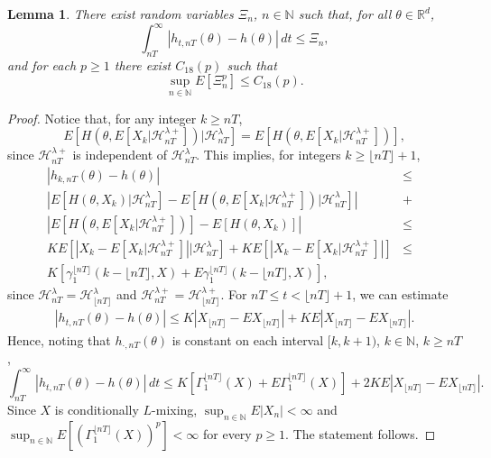 \documentclass[a4paper,draft]{article}
\newtheorem{lemma}[theorem]{Lemma}
\begin{document}
\begin{lemma}\label{kkk}
There exist random variables $\Xi_n$, $n\in\mathbb{N}$ such that, for all $\theta\in\mathbb{R}^d$,
$$
\int_{nT}^{\infty}|h_{t,nT}(\theta)-h(\theta)|\, dt\leq \Xi_n,
$$
and for each $p\geq 1$ there exist $C_{18}(p)$ such that
$$
\sup_{n\in\mathbb{N}} E[\Xi_n^p]\leq C_{18}(p).
$$
\end{lemma}
\begin{proof}
Notice that, for any integer $k\geq nT$,
$$
E[H(\theta,E[X_k\vert\mathcal{H}_{nT}^{\lambda +}])\vert\mathcal{H}_{nT}^{\lambda}]=
E[H(\theta, E[X_k\vert\mathcal{H}_{nT}^{\lambda +}])],
$$
since $\mathcal{H}_{nT}^{\lambda +}$ is independent
of $\mathcal{H}_{nT}^{\lambda}$.
This implies, for integers $k\geq \lfloor nT\rfloor+1$,
\begin{eqnarray*}
|h_{k,nT}(\theta)-h(\theta)| &\leq&\\
\left|E[H(\theta,X_k)|\mathcal{H}_{nT}^{\lambda}]-
E[H(\theta,E[X_k\vert\mathcal{H}_{nT}^{\lambda+}])\vert\mathcal{H}_{nT}^{\lambda}]\right|
&+&\\
\left|E[H(\theta, E[X_k\vert\mathcal{H}_{nT}^{\lambda+}])]-E[H(\theta,X_k)]\right| &\leq&\\
KE[|X_k-E[X_k\vert\mathcal{H}_{nT}^{\lambda+}]|\vert\mathcal{H}_{nT}^{\lambda}]
+KE[|X_k-E[X_k\vert\mathcal{H}_{nT}^{\lambda+}]|] &\leq&\\
K[\gamma_1^{\lfloor nT\rfloor}(k-\lfloor nT\rfloor,X) + E\gamma_1^{\lfloor nT\rfloor}(k-\lfloor nT\rfloor,X)], & &
\end{eqnarray*}
since $\mathcal{H}^{\lambda}_{nT}=\mathcal{H}^{\lambda}_{\lfloor nT\rfloor}$
and $\mathcal{H}^{\lambda+}_{nT}=\mathcal{H}^{\lambda+}_{\lfloor nT\rfloor}$.
For $nT\leq t<\lfloor nT\rfloor+1$, we can estimate
\begin{eqnarray*}
|h_{t,nT}(\theta)-h(\theta)|\leq
K|X_{\lfloor nT\rfloor}-EX_{\lfloor nT\rfloor}|+KE|X_{{\lfloor nT\rfloor}}-EX_{\lfloor nT\rfloor}|.
\end{eqnarray*}
Hence, noting that $h_{\cdot,nT}(\theta)$ is constant on each interval
$[k,k+1)$, $k\in\mathbb{N}$, $k\geq nT$,
$$
\int_{nT}^{\infty}|h_{t,nT}(\theta)-h(\theta)|\, dt\leq K[\Gamma_1^{\lfloor nT\rfloor}(X)
+E\Gamma_1^{\lfloor nT\rfloor}(X)]+2KE|X_{\lfloor nT\rfloor}-EX_{\lfloor nT\rfloor}|.
$$
Since $X$ is conditionally $L$-mixing, $\sup_{n\in\mathbb{N}}E|X_n|<\infty$
and
$\sup_{n\in\mathbb{N}}E[(\Gamma_1^{\lfloor nT\rfloor}(X))^p]<\infty$ for every $p\geq 1$. The statement follows.
\end{proof}
\end{document}
